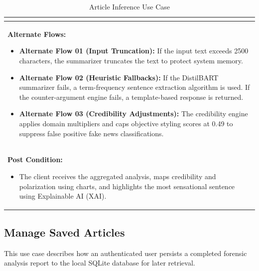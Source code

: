 \begin{table}[H]
\begin{tabularx}{\textwidth}{| X |}
\begin{itemize}
        \end{itemize} \\
        \hline
        \textbf{Alternate Flows:}
        \begin{itemize}
            \item \textbf{Alternate Flow 01 (Input Truncation):} If the input text exceeds 2500 characters, the summarizer truncates the text to protect system memory.
            \item \textbf{Alternate Flow 02 (Heuristic Fallbacks):} If the DistilBART summarizer fails, a term-frequency sentence extraction algorithm is used. If the counter-argument engine fails, a template-based response is returned.
            \item \textbf{Alternate Flow 03 (Credibility Adjustments):} The credibility engine applies domain multipliers and caps objective styling scores at 0.49 to suppress false positive fake news classifications.
        \end{itemize} \\
        \hline
        \textbf{Post Condition:}
        \begin{itemize}
            \item The client receives the aggregated analysis, maps credibility and polarization using charts, and highlights the most sensational sentence using Explainable AI (XAI).
        \end{itemize} \\
        \hline
    \end{tabularx}
    \caption{Article Inference Use Case}
    \label{tab:article_inference_use_case}
\end{table}

\clearpage
\subsection{Manage Saved Articles}
This use case describes how an authenticated user persists a completed forensic analysis report to the local SQLite database for later retrieval.

